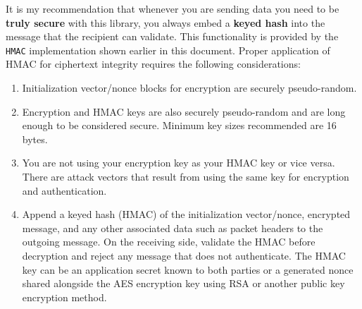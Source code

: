 \documentclass[titlepage]{article}
\begin{document}
			It is my recommendation that whenever you are sending data you need to be \textbf{truly secure} with this library, you always embed a \textbf{keyed hash} into the message that the recipient can validate. This functionality is provided by the \texttt{HMAC} implementation shown earlier in this document. Proper application of HMAC for ciphertext integrity requires the following considerations:
			\begin{enumerate}
				\item Initialization vector/nonce blocks for encryption are securely pseudo-random.
				\item Encryption and HMAC keys are also securely pseudo-random and are long enough to be considered secure. Minimum key sizes recommended are 16 bytes.
				\item You are not using your encryption key as your HMAC key or vice versa. There are attack vectors that result from using the same key for encryption and authentication.
				\item Append a keyed hash (HMAC) of the initialization vector/nonce, encrypted message, and any other associated data such as packet headers to the outgoing message. On the receiving side, validate the HMAC before decryption and reject any message that does not authenticate. The HMAC key can be an application secret known to both parties or a generated nonce shared alongside the AES encryption key using RSA or another public key encryption method.
			\end{enumerate}
\end{document}
